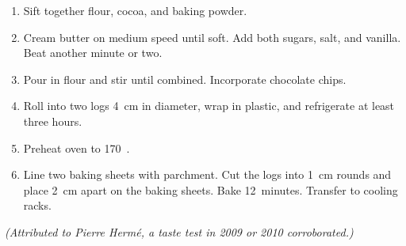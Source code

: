 

\begin{ingredients}
\end{ingredients}


\begin{recipe}
  \begin{enumerate}

  \item Sift together flour, cocoa, and baking powder.

  \item Cream butter on medium speed until soft.  Add both sugars,
    salt, and vanilla.  Beat another minute or two.

  \item Pour in flour and stir until combined.  Incorporate chocolate
    chips.

  \item Roll into two logs 4~cm in diameter, wrap in plastic, and
    refrigerate at least three hours.

  \item Preheat oven to 170~\C.

  \item Line two baking sheets with parchment.  Cut the logs into 1~cm
    rounds and place 2~cm apart on the baking sheets.  Bake
    12~minutes.  Transfer to cooling racks.

  \end{enumerate}
\end{recipe}


\textit{\footnotesize (Attributed to Pierre Herm\'e, a taste test in 2009 or 2010 corroborated.)}
